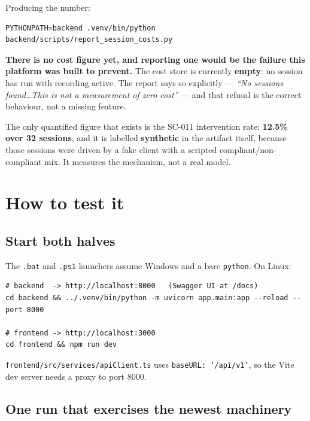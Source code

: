 \documentclass[11pt,a4paper]{article}
\begin{document}
Producing the number:

\begin{lstlisting}
PYTHONPATH=backend .venv/bin/python backend/scripts/report_session_costs.py
\end{lstlisting}

\begin{notebox}[colframe=warn]
\textbf{There is no cost figure yet, and reporting one would be the failure this
platform was built to prevent.} The cost store is currently \textbf{empty}: no
session has run with recording active. The report says so explicitly ---
\emph{``No sessions found\ldots This is not a measurement of zero cost''} --- and
that refusal is the correct behaviour, not a missing feature.

The only quantified figure that exists is the SC-011 intervention rate:
\textbf{12.5\% over 32 sessions}, and it is labelled \textbf{synthetic} in the
artifact itself, because those sessions were driven by a fake client with a
scripted compliant/non-compliant mix. It measures the mechanism, not a real model.
\end{notebox}

\section{How to test it}

\subsection{Start both halves}

The \texttt{.bat} and \texttt{.ps1} launchers assume Windows and a bare
\texttt{python}. On Linux:

\begin{lstlisting}
# backend  -> http://localhost:8000   (Swagger UI at /docs)
cd backend && ../.venv/bin/python -m uvicorn app.main:app --reload --port 8000

# frontend -> http://localhost:3000
cd frontend && npm run dev
\end{lstlisting}

\texttt{frontend/src/services/apiClient.ts} uses \texttt{baseURL: '/api/v1'}, so
the Vite dev server needs a proxy to port 8000.

\subsection{One run that exercises the newest machinery}
\end{document}
